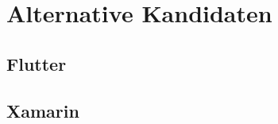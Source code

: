 \section{Alternative Kandidaten}
\subsection{Flutter}
\label{flutter}

\subsection{Xamarin}
\label{xamarin}

